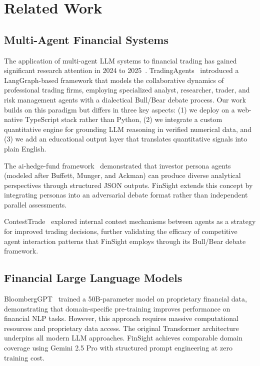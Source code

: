 \documentclass[conference]{IEEEtran}
\begin{document}
\section{Related Work}
\label{sec:related}

\subsection{Multi-Agent Financial Systems}

The application of multi-agent LLM systems to financial trading has gained significant research attention in 2024 to 2025~\cite{ding2024llmagent, li2024llmfinance}. TradingAgents~\cite{xiao2024tradingagents} introduced a LangGraph-based framework that models the collaborative dynamics of professional trading firms, employing specialized analyst, researcher, trader, and risk management agents with a dialectical Bull/Bear debate process. Our work builds on this paradigm but differs in three key aspects: (1) we deploy on a web-native TypeScript stack rather than Python, (2) we integrate a custom quantitative engine for grounding LLM reasoning in verified numerical data, and (3) we add an educational output layer that translates quantitative signals into plain English.

The ai-hedge-fund framework~\cite{virattt2024aihedgefund} demonstrated that investor persona agents (modeled after Buffett, Munger, and Ackman) can produce diverse analytical perspectives through structured JSON outputs. FinSight extends this concept by integrating personas into an adversarial debate format rather than independent parallel assessments.

ContestTrade~\cite{zhao2025contesttrade} explored internal contest mechanisms between agents as a strategy for improved trading decisions, further validating the efficacy of competitive agent interaction patterns that FinSight employs through its Bull/Bear debate framework.

\subsection{Financial Large Language Models}

BloombergGPT~\cite{wu2023bloomberggpt} trained a 50B-parameter model on proprietary financial data, demonstrating that domain-specific pre-training improves performance on financial NLP tasks. However, this approach requires massive computational resources and proprietary data access. The original Transformer architecture~\cite{vaswani2017attention} underpins all modern LLM approaches. FinSight achieves comparable domain coverage using Gemini 2.5 Pro with structured prompt engineering at zero training cost.
\end{document}
